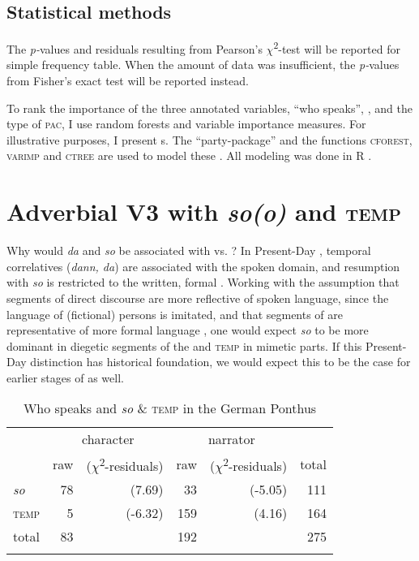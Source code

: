\documentclass[output=paper,colorlinks,citecolor=brown]{langscibook}
\begin{document}
\subsection{Statistical methods}\label{sec:3.4}
The \textit{p-}values and residuals resulting from Pearson's $\chi$\textsuperscript{2}-test will be reported for simple frequency table. When the amount of data was insufficient, the \textit{p-}values from Fisher's exact test will be reported instead.

To rank the importance of the three annotated variables, “who speaks”, , and the type of \textsc{pac}, I use random forests and variable importance measures. For illustrative purposes, I present s. The “party-package” and the functions \textsc{cforest, varimp} and \textsc{ctree} are used to model these \citep{Hothorn2006, Strobl2007, Strobl2008}. All modeling was done in R \citep{R}. %


\section{Adverbial V3 with \textit{so(o)} and \textsc{temp}}\label{sec:4}

Why would \textit{da} and \textit{so} be associated with  vs. ? In Present-Day , temporal correlatives (\textit{dann, da}) are associated with the spoken domain, and resumption with \textit{so} is restricted to the written, formal  \citep{Catasso2021, Axel2023}. Working with the assumption that segments of direct discourse are more reflective of spoken language, since the language of (fictional) persons is imitated, and that segments of  are representative of more formal language \citep{Ebeling2020}, one would expect \textit{so} to be more dominant in diegetic segments of the  and \textsc{temp} in mimetic parts. If this Present-Day  distinction has historical foundation, we would expect this to be the case for earlier stages of  as well.

\begin{table}
\begin{tabularx}{0.8\textwidth}{Xrrrrr}
\lsptoprule
& \multicolumn{2}{c}{character} & \multicolumn{2}{c}{narrator} & \\
& {raw} & {($\chi$\textsuperscript{2}-residuals)} & {raw} & {($\chi$\textsuperscript{2}-residuals)} & {total}\\
\midrule
\textit{so} & 78 &(7.69) & 33 &(-5.05) & 111 \\
\textsc{temp} & 5 &(-6.32) & 159 &(4.16) & 164\\
\midrule
total & 83 & & 192& & 275 \\
\lspbottomrule
\end{tabularx}
\caption{Who speaks and \textit{so} \& \textsc{temp} in the German Ponthus}\label{tab-RE:mim}

\end{table}
\end{document}
